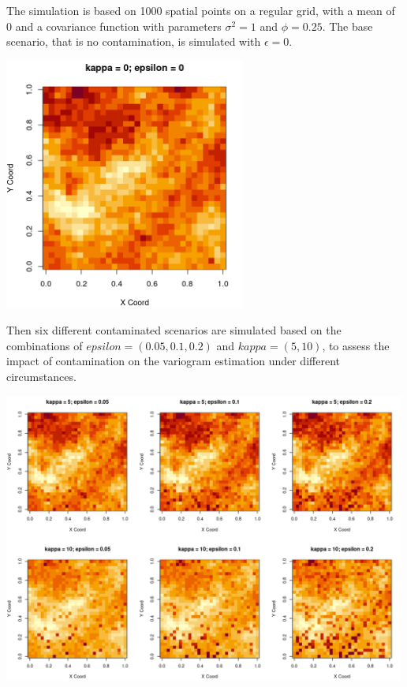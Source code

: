 \documentclass[
  12pt]{article}
\begin{document}
The simulation is based on 1000 spatial points on a regular grid, with a
mean of 0 and a covariance function with parameters \(\sigma^2 = 1\) and
\(\phi = 0.25\). The base scenario, that is no contamination, is
simulated with \(\epsilon = 0\).

\begin{center}
\includegraphics[width=3.125in,height=\textheight]{img/grf.png}
\end{center}

Then six different contaminated scenarios are simulated based on the
combinations of \(epsilon = (0.05, 0.1, 0.2)\) and \(kappa = (5, 10)\),
to assess the impact of contamination on the variogram estimation under
different circumstances.

\begin{center}
\includegraphics[width=5.20833in,height=\textheight]{img/cgrf.png}
\end{center}
\end{document}
